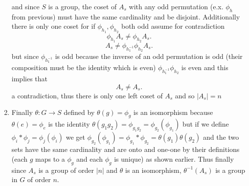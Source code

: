 \documentclass{article}
\begin{document}
\begin{enumerate}
            and since $S$ is a group, the coset of $A_s$ with any odd  permutation (e.x.  $\phi_h$ from previous) must have the same cardinality and be disjoint.
            Additionally there is only one coset for if
            $\phi_{h_1}, \phi_{h_2}$ both odd assume for contradiction
            \[
                \phi_{h_1}A_s \ne \phi_{h_2}A_s
            .\] 
            \[
                A_s \ne \phi_{h_1^{-1}}\phi_{h_2}A_s
            .\] 
            but since $\phi_{h_1^{-1}}$ is odd because the inverse of an odd permutation is odd (their composition must be the identity which is even)
            $\phi_{h_1^{-1}}\phi_{h_2}$ is even and this implies that
            \[
            A_s \ne A_s
            .\] 
            a contradiction, thus there is only one left coset of $A_s$ and so $|A_s| = n$
        \item Finally $\theta : G \rightarrow S$ defined by $\theta(g) = \phi_g$ is an isomorphism because \\
            $\theta(e) = \phi_e$ is the identity
            $\theta(g_1g_2) = \phi_{g_1g_2} = \phi_{g_2}(\phi_{g_1}) $ but if we define $\phi_i * \phi_j = \phi_j(\phi_i)$ we get
            $\phi_{g_2}(\phi_{g_1}) = \phi_{g_1} * \phi_{g_2} = \theta(g_1)\theta(g_2)$ and the two sets have the same cardinality and are
            onto and one-one by their definitions (each $g$ maps to a $\phi_g$ and each $\phi_g$ is unique) as shown earlier. 
            Thus finally since $A_s$ is a group of order $|n|$ and $\theta$ is an isomorphism, $\theta^{-1}(A_s)$ is a group in $G$ of order $n$.
    \end{enumerate}
\end{document}
